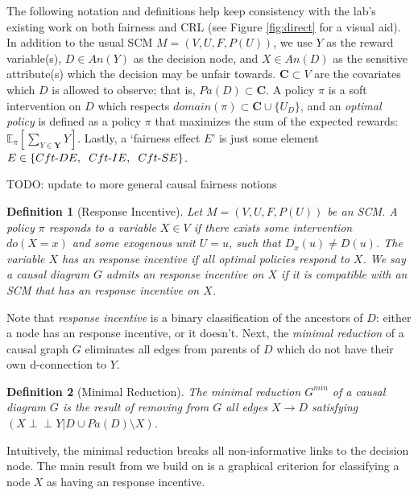 \documentclass[letterpaper,10pt]{article}
\newtheorem{definition}{Definition}
\newcommand\indep{\perp \!\!\! \perp}
\begin{document}
The following notation and definitions help keep consistency with the lab's existing work on both fairness\cite{r30} and CRL \cite{r57} (see Figure \ref{fig:direct} for a visual aid). In addition to the usual SCM $M=(V,U,F,P(U))$, we use $Y$ as the reward variable(s), $D\in An(Y)$ as the decision node, and $X\in An(D)$ as the sensitive attribute(s) which the decision may be unfair towards. $\mathbf{C}\subset V$ are the covariates which $D$ is allowed to observe; that is, $Pa(D)\subset \mathbf{C}$. A policy $\pi$ is a soft intervention on $D$ which respects $domain(\pi)\subset \mathbf{C}\cup \{U_D\}$, and an \emph{optimal policy} is defined as a policy $\pi$ that maximizes the sum of the expected rewards: $\mathbb{E}_\pi [\sum_{Y\in\mathbf{Y}}Y]$.
Lastly, a `fairness effect $E$' is just some element $E\in\{Cft{\text -}DE,\hspace{2mm} Cft{\text -}IE,\hspace{2mm} Cft{\text -}SE\}$.

\color{red} TODO: update to more general causal fairness notions \color{black}

\begin{definition}[Response Incentive]
Let $M=(V,U,F,P(U))$ be an SCM. A policy $\pi$ responds to a variable $X\in V$ if there exists some intervention $do(X=x)$ and some exogenous unit $U=u$, such that $D_x(u) \neq D(u)$. The variable $X$ has an \emph{response incentive} if all optimal policies respond to $X$.
We say a causal diagram $G$ \emph{admits} an response incentive on $X$ if it is compatible with an SCM that has an response incentive on $X$.
\end{definition}

Note that \emph{response incentive} is a binary classification of the ancestors of $D$: either a node has an response incentive, or it doesn't.
Next, the \emph{minimal reduction} of a causal graph $G$ eliminates all edges from parents of $D$ which do not have their own d-connection to $Y$.

\begin{definition}[Minimal Reduction]
The \emph{minimal reduction} $G^{min}$ of a causal diagram $G$ is the result of removing from $G$ all edges $X\rightarrow D$ satisfying $(X\indep Y | D \cup Pa(D) \setminus X)$.
\end{definition}

Intuitively, the minimal reduction breaks all non-informative links to the decision node.
The main result from \cite{everitt2021agent} we build on is a graphical criterion for classifying a node $X$ as having an response incentive.
\end{document}
